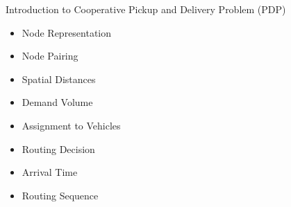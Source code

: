 \documentclass{beamer}
\begin{document}
\begin{frame}{Introduction to Cooperative Pickup and Delivery Problem (PDP)}
	\begin{itemize}
		\item Node Representation
		\item Node Pairing
		\item Spatial Distances
		\item Demand Volume
		\item Assignment to Vehicles
		\item Routing Decision
		\item Arrival Time
		\item Routing Sequence
	\end{itemize}
\end{frame}
\end{document}
